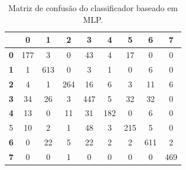 \begin{table}[H]
	\centering
	\begin{tabular}{c||c|c|c|c|c|c|c|c|}
		\cline{2-9}
		\textbf{}                        & \textbf{0} & \textbf{1} & \textbf{2} & \textbf{3} & \textbf{4} & \textbf{5} & \textbf{6} & \textbf{7} \\ \hline \hline
		\multicolumn{1}{|c||}{\textbf{0}} & 177        & 3          & 0          & 43         & 4          & 17         & 0          & 0          \\ \hline
		\multicolumn{1}{|c||}{\textbf{1}} & 1          & 613        & 0          & 3          & 1          & 0          & 6          & 0          \\ \hline
		\multicolumn{1}{|c||}{\textbf{2}} & 4          & 1          & 264        & 16         & 6          & 3          & 11         & 6          \\ \hline
		\multicolumn{1}{|c||}{\textbf{3}} & 34         & 26         & 3          & 447        & 5          & 32         & 32         & 0          \\ \hline
		\multicolumn{1}{|c||}{\textbf{4}} & 13         & 0          & 11         & 31         & 182        & 0          & 6          & 0          \\ \hline
		\multicolumn{1}{|c||}{5}          & 10         & 2          & 1          & 48         & 3          & 215        & 5          & 0          \\ \hline
		\multicolumn{1}{|c||}{\textbf{6}} & 0          & 22         & 5          & 22         & 2          & 2          & 611        & 2          \\ \hline
		\multicolumn{1}{|c||}{\textbf{7}} & 0          & 0          & 1          & 0          & 0          & 0          & 0          & 469        \\ \hline
	\end{tabular}
	\caption{Matriz de confusão do classificador baseado em MLP.}
	\label{tab:mc_MLP}
\end{table}

